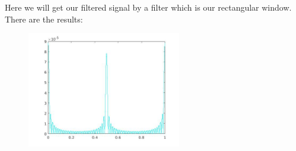 \documentclass[a4paper,11pt]{article}
\begin{document}
Here we will get our filtered signal by a filter which is our rectangular window. There are the results:

\begin{figure}[!hp]
    \begin{center}
      \includegraphics[width=0.6\textwidth]{images/lab2_61.jpg}
    \end{center}
\end{figure}

\newpage
\end{document}
